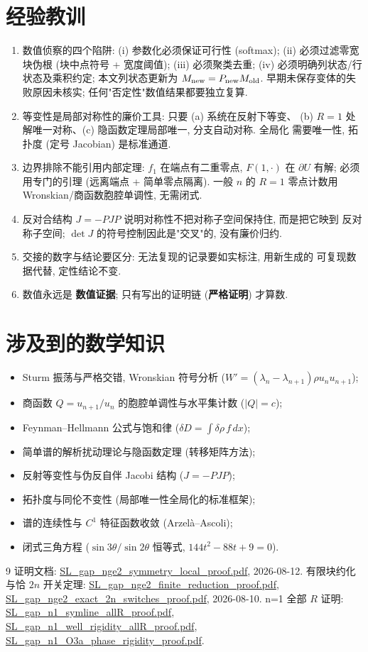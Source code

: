 \documentclass[UTF8]{ctexart}
\newcommand{\STRICT}{\textbf{严格证明}}
\newcommand{\EVIDENCE}{\textbf{数值证据}}
\begin{document}
\section{经验教训}

\begin{enumerate}
	\item 数值侦察的四个陷阱: (i) 参数化必须保证可行性 (softmax);
	(ii) 必须过滤零宽块伪根 (块中点符号 + 宽度阈值); (iii) 必须聚类去重;
	(iv) 必须明确列状态/行状态及乘积约定; 本文列状态更新为
	$M_{\rm new}=P_{\rm new}M_{\rm old}$. 早期未保存变体的失败原因未核实;
	任何"否定性"数值结果都要独立复算.
	\item 等变性是局部对称性的廉价工具: 只要 (a) 系统在反射下等变、
	(b) $R=1$ 处解唯一对称、(c) 隐函数定理局部唯一, 分支自动对称. 全局化
	需要唯一性, 拓扑度 (定号 Jacobian) 是标准通道.
	\item 边界排除不能引用内部定理: $f_1$ 在端点有二重零点, $F(1,\cdot)$
	在 $\partial U$ 有解; 必须用专门的引理 (远离端点 + 简单零点隔离).
	一般 $n$ 的 $R=1$ 零点计数用 Wronskian/商函数胞腔单调性, 无需闭式.
	\item 反对合结构 $J=-PJP$ 说明对称性不把对称子空间保持住, 而是把它映到
	反对称子空间; $\det J$ 的符号控制因此是"交叉"的, 没有廉价归约.
	\item 交接的数字与结论要区分: 无法复现的记录要如实标注, 用新生成的
	可复现数据代替, 定性结论不变.
	\item 数值永远是 \EVIDENCE; 只有写出的证明链 (\STRICT) 才算数.
\end{enumerate}

\section{涉及到的数学知识}

\begin{itemize}
	\item Sturm 振荡与严格交错, Wronskian 符号分析 ($W'=(\lambda_n-\lambda_{n+1})\rho u_nu_{n+1}$);
	\item 商函数 $Q=u_{n+1}/u_n$ 的胞腔单调性与水平集计数 ($|Q|=c$);
	\item Feynman--Hellmann 公式与饱和律 ($\delta D=\int\delta\rho\,f\,dx$);
	\item 简单谱的解析扰动理论与隐函数定理 (转移矩阵方法);
	\item 反射等变性与伪反自伴 Jacobi 结构 ($J=-PJP$);
	\item 拓扑度与同伦不变性 (局部唯一性全局化的标准框架);
	\item 谱的连续性与 $C^1$ 特征函数收敛 (Arzel\`a--Ascoli);
	\item 闭式三角方程 ($\sin3\theta/\sin2\theta$ 恒等式, $144t^2-88t+9=0$).
\end{itemize}

\begin{thebibliography}{9}
 证明文档: \url{SL_gap_nge2_symmetry_local_proof.pdf}, 2026-08-12.
 有限块约化与恰 $2n$ 开关定理:
\url{SL_gap_nge2_finite_reduction_proof.pdf}, \url{SL_gap_nge2_exact_2n_switches_proof.pdf}, 2026-08-10.
 n=1 全部 $R$ 证明: \url{SL_gap_n1_symline_allR_proof.pdf},
\url{SL_gap_n1_well_rigidity_allR_proof.pdf}, \url{SL_gap_n1_O3a_phase_rigidity_proof.pdf}.
\end{thebibliography}
\end{document}
